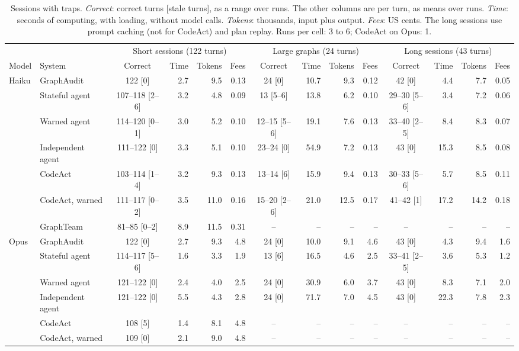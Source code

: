 \documentclass[sigconf,9pt]{acmart}
\newcommand{\sys}{GraphAudit}
\begin{document}
\begin{table}[t]
\caption{Sessions with traps. \emph{Correct}: correct turns [stale turns], as a range over runs.
The other columns are per turn, as means over runs. \emph{Time}: seconds of computing, with loading, without model calls. \emph{Tokens}: thousands, input plus output. \emph{Fees}: US cents. The
long sessions use prompt caching (not for CodeAct) and plan replay. Runs per cell: 3 to 6; CodeAct on
Opus: 1.}
\label{tab:traps}
\footnotesize
\renewcommand{\arraystretch}{0.88}
\setlength{\tabcolsep}{4.6pt}
\begin{tabular}{@{}ll crrr crrr crrr@{}}
\toprule
 & & \multicolumn{4}{c}{Short sessions (122 turns)} & \multicolumn{4}{c}{Large graphs (24 turns)} & \multicolumn{4}{c}{Long sessions (43 turns)} \\
\cmidrule(lr){3-6}\cmidrule(lr){7-10}\cmidrule(l){11-14}
Model & System & Correct & Time & Tokens & Fees & Correct & Time & Tokens & Fees & Correct & Time & Tokens & Fees \\
\midrule
Haiku & \sys{} & 122 [0] & 2.7 & 9.5 & 0.13 & 24 [0] & 10.7 & 9.3 & 0.12 & 42 [0] & 4.4 & 7.7 & 0.05 \\
 & Stateful agent & 107--118 [2--6] & 3.2 & 4.8 & 0.09 & 13 [5--6] & 13.8 & 6.2 & 0.10 & 29--30 [5--6] & 3.4 & 7.2 & 0.06 \\
 & Warned agent & 114--120 [0--1] & 3.0 & 5.2 & 0.10 & 12--15 [5--6] & 19.1 & 7.6 & 0.13 & 33--40 [2--5] & 8.4 & 8.3 & 0.07 \\
 & Independent agent & 111--122 [0] & 3.3 & 5.1 & 0.10 & 23--24 [0] & 54.9 & 7.2 & 0.13 & 43 [0] & 15.3 & 8.5 & 0.08 \\
 & CodeAct & 103--114 [1--4] & 3.2 & 9.3 & 0.13 & 13--14 [6] & 15.9 & 9.4 & 0.13 & 30--33 [5--6] & 5.7 & 8.5 & 0.11 \\
 & CodeAct, warned & 111--117 [0--2] & 3.5 & 11.0 & 0.16 & 15--20 [2--6] & 21.0 & 12.5 & 0.17 & 41--42 [1] & 17.2 & 14.2 & 0.18 \\
 & GraphTeam & 81--85 [0--2] & 8.9 & 11.5 & 0.31 & --            & --   & --   & --   & --            & --   & --   & --   \\
\midrule
Opus & \sys{} & 122 [0] & 2.7 & 9.3 & 4.8 & 24 [0] & 10.0 & 9.1 & 4.6 & 43 [0] & 4.3 & 9.4 & 1.6 \\
 & Stateful agent & 114--117 [5--6] & 1.6 & 3.3 & 1.9 & 13 [6] & 16.5 & 4.6 & 2.5 & 33--41 [2--5] & 3.6 & 5.3 & 1.2 \\
 & Warned agent & 121--122 [0] & 2.4 & 4.0 & 2.5 & 24 [0] & 30.9 & 6.0 & 3.7 & 43 [0] & 8.3 & 7.1 & 2.0 \\
 & Independent agent & 121--122 [0] & 5.5 & 4.3 & 2.8 & 24 [0] & 71.7 & 7.0 & 4.5 & 43 [0] & 22.3 & 7.8 & 2.3 \\
 & CodeAct & 108 [5] & 1.4 & 8.1 & 4.8 & --            & --   & --   & --   & --            & --   & --   & --   \\
 & CodeAct, warned & 109 [0] & 2.1 & 9.0 & 4.8 & --            & --   & --   & --   & --            & --   & --   & --   \\
\bottomrule
\end{tabular}
\end{table}
\end{document}
